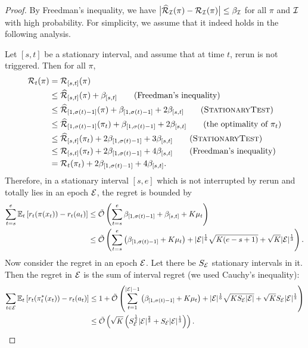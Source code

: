 \begin{proof}
By Freedman's inequality, we have $\big\lvert\widehat{\cal{R}}_{\mathcal{I}}(\pi)-{\mathcal{R}}_{\mathcal{I}}(\pi)\big\rvert\leq \beta_{{\mathcal{I}}}$ for all $\pi$ and ${\mathcal{I}}$ with high probability. For simplicity, we assume that it indeed holds in the following analysis. 

Let $[s,t]$ be a stationary interval, and assume that at time $t$, rerun is not triggered. Then for all $\pi$, 
\begin{align*}
\calR_{t}(\pi)&=\calR_{[s,t]}(\pi) \\
&\leq \avgR_{[s,t]}(\pi) + \beta_{[s,t]} \tag{Freedman's inequality} \\
&\leq \avgR_{[1,\sigma(t)-1]}(\pi)+\beta_{[1,\sigma(t)-1]}+2\beta_{[s,t]} \tag{\textsc{StationaryTest}}\\
&\leq \avgR_{[1,\sigma(t)-1]}(\pi_t)+\beta_{[1,\sigma(t)-1]}+2\beta_{[s,t]} \tag{the optimality of $\pi_t$}\\
&\leq \avgR_{[s,t]}(\pi_t)+2\beta_{[1,\sigma(t)-1]}+3\beta_{[s,t]} \tag{\textsc{StationaryTest}}\\
&\leq \calR_{[s,t]}(\pi_t)+2\beta_{[1,\sigma(t)-1]}+4\beta_{[s,t]} \tag{Freedman's inequality}\\
&= \calR_{t}(\pi_t)+2\beta_{[1,\sigma(t)-1]}+4\beta_{[s,t]}.
\end{align*}
Therefore, in a stationary interval $[s,e]$ which is not interrupted by rerun and totally lies in an epoch ${\mathcal{E}}$, the regret is bounded by
\begin{align*}
\sum_{t=s}^e \mathbb{E}_t\left[r_t(\pi(x_t))-r_t(a_t)\right]
&\leq \tilde{\mathcal{O}}\left( \sum_{t=s}^e \beta_{[1,\sigma(t)-1]}+\beta_{[s,t]}+K\mu_t \right)\\
&\leq \tilde{\mathcal{O}}\left( \sum_{t=s}^e \left(\beta_{[1,\sigma(t)-1]}+K\mu_t \right)+\lvert{\mathcal{E}}\rvert^{\frac{1}{6}}\sqrt{K(e-s+1)} + \sqrt{K}\lvert{\mathcal{E}}\rvert^{\frac{1}{3}} \right).\end{align*}
Now consider the regret in an epoch ${\mathcal{E}}$. Let there be $S_{\mathcal{E}}$ stationary intervals in it. Then the regret in ${\mathcal{E}}$ is the sum of interval regret (we used Cauchy's inequality): 
\begin{align*}
\sum_{t\in\calE} \mathbb{E}_t\left[r_t(\pi_t^*(x_t))-r_t(a_t)\right] 
&\leq 1+\tilde{\mathcal{O}}\left( \sum_{t=1}^{\abs{\calE}-1} \left( \beta_{[1,\sigma(t)-1]}+K\mu_t \right) +\abs{\calE}^{\frac{1}{6}}\sqrt{KS_\calE \abs{\calE}} + \sqrt{K}S_\calE\abs{\calE}^{\frac{1}{3}} \right)\\
&\leq \tilde{\mathcal{O}}\left( \sqrt{K} \left(S_\calE^{\frac{1}{2}} \abs{\calE}^{\frac{2}{3}} + S_\calE \abs{\calE}^{\frac{1}{3}} \right) \right).

\end{align*}
\end{proof}

